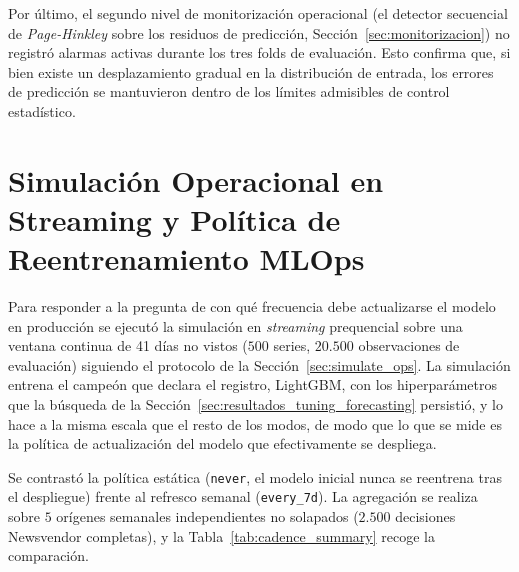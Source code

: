 Por último, el segundo nivel de monitorización operacional (el detector secuencial de \textit{Page-Hinkley} sobre los residuos de predicción, Sección~\ref{sec:monitorizacion}) no registró alarmas activas durante los tres folds de evaluación. Esto confirma que, si bien existe un desplazamiento gradual en la distribución de entrada, los errores de predicción se mantuvieron dentro de los límites admisibles de control estadístico.


\section{Simulación Operacional en Streaming y Política de Reentrenamiento MLOps}
\label{sec:resultados_simulacion}

Para responder a la pregunta de con qué frecuencia debe actualizarse el modelo en producción se ejecutó la simulación en \textit{streaming} prequencial sobre una ventana continua de 41 días no vistos ($500$ series, $20.500$ observaciones de evaluación) siguiendo el protocolo de la Sección~\ref{sec:simulate_ops}. La simulación entrena el campeón que declara el registro, LightGBM, con los hiperparámetros que la búsqueda de la Sección~\ref{sec:resultados_tuning_forecasting} persistió, y lo hace a la misma escala que el resto de los modos, de modo que lo que se mide es la política de actualización del modelo que efectivamente se despliega.

Se contrastó la política estática (\texttt{never}, el modelo inicial nunca se reentrena tras el despliegue) frente al refresco semanal (\texttt{every\_7d}). La agregación se realiza sobre $5$ orígenes semanales independientes no solapados ($2.500$ decisiones Newsvendor completas), y la Tabla~\ref{tab:cadence_summary} recoge la comparación.

\begin{table}[htbp]
    \centering
    \small
    \caption[Simulación en \textit{streaming} por cadencia]{Simulación operacional en \textit{streaming} (ventana de 41 días, 500 series, 5 orígenes independientes, campeón LightGBM afinado). El refresco semanal reduce el coste de inventario un $40{,}28\%$ frente al modelo estático, con un intervalo al $95\%$ de $[-57{,}45\%,\ -17{,}00\%]$ que la Sección declara no concluyente por el número de orígenes disponibles.}
    \label{tab:cadence_summary}
\end{table}

